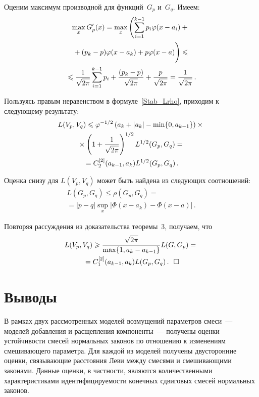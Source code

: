 \begin{multicols}{2}
Оценим максимум производной для функций~$G_p$ и~$G_q$. Имеем:
\begin{multline*}
\max\limits_x G_p'(x)=\max\limits_x\left(\sum\limits_{i=1}^{k-1}
p_i\varphi(x-a_i)+{}\right.\\
\left.{}+(p_k-p)\varphi(x-a_k)+p\varphi(x-a)
\vphantom{\sum\limits_{i=1}^{k-1}}\right)\leqslant{}\\
{}\leqslant \fr{1}{\sqrt{2\pi}}\sum\limits_{i=1}^{k-1}
p_i+\fr{(p_k-p)}{\sqrt{2\pi}}+\fr{p}{\sqrt{2\pi}}
=\fr{1}{\sqrt{2\pi}}\,.
\end{multline*}

Пользуясь правым неравенством в формуле~\eqref{Stab_Lrho},
приходим к следующему результату:
\begin{multline*}
L(V_p,V_q)\leqslant\varphi^{-1/2}\left(a_k+|a_k|-\min\{0,a_{k-1}\}\right)\times{}\\
{}\times
\left(1+\displaystyle\frac{\displaystyle 1\mathstrut}{\displaystyle \sqrt{2\pi}\mathstrut}\right)^{1/2}L^{1/2}(G_p,G_q)={}\\
{}=C_2^{[2]}(a_{k-1},a_k)L^{1/2}(G_p,G_q)\,.
\end{multline*}

Оценка снизу для $L(V_p,V_q)$ может быть найдена из следующих
соотношений:
\begin{multline*}
L(G_p,G_q)\leqslant\rho(G_p,G_q)={}\\
{}=|p-q|\sup\limits_x|
\Phi(x-a_k)-\Phi(x-a)|\,.
\end{multline*}

Повторяя рассуждения из доказательства
теоремы~3, получаем, что
\begin{multline*}
L(V_p,V_q)\geqslant\displaystyle\frac{\displaystyle \sqrt{2\pi}\mathstrut}{\displaystyle \max\{1,a_k-a_{k-1}\}\mathstrut}L(G,G_p)
={}\\
{}=C_1^{[2]}(a_{k-1},a_k)L(G_p,G_q)\,.~~\square
\end{multline*}


\section{Выводы}

В рамках двух рассмотренных моделей возмущений параметров смеси~---
моделей добавления и расщепления компоненты~--- получены оценки
устойчивости смесей нормальных законов по отношению к изменениям
смешивающего параметра. Для каждой из моделей получены
двусторонние оценки, связывающие расстояния Леви между смесями и
смешивающими законами. Данные оценки, в частности, являются
количественными характеристиками идентифицируемости конечных
сдвиговых смесей нормальных законов.


\end{multicols}

